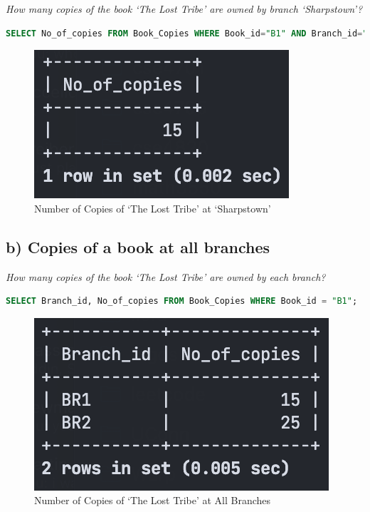 \documentclass{article}
\begin{document}
\textit{How many copies of the book `The Lost Tribe' are owned by branch `Sharpstown'?}

\begin{lstlisting}[language=SQL,
    deletekeywords={IDENTITY},
    deletekeywords={[2]INT},
    morekeywords={clustered},
    framesep=8pt,
    xleftmargin=40pt,
    framexleftmargin=40pt,
    frame=tb,
    framerule=0pt ]
SELECT No_of_copies FROM Book_Copies WHERE Book_id="B1" AND Branch_id="BR1";
\end{lstlisting}

\begin{figure}[!h]
    \centering
    \includegraphics[scale=0.6]{images/q4-a-results.png}
    \caption{Number of Copies of `The Lost Tribe' at `Sharpstown'}
    \label{fig:q4_a_copies_of_book}
\end{figure}

\subsection{b) Copies of a book at all branches}

\textit{How many copies of the book `The Lost Tribe' are owned by each branch?}

\begin{lstlisting}[language=SQL,
    deletekeywords={IDENTITY},
    deletekeywords={[2]INT},
    morekeywords={clustered},
    framesep=8pt,
    xleftmargin=40pt,
    framexleftmargin=40pt,
    frame=tb,
    framerule=0pt ]
SELECT Branch_id, No_of_copies FROM Book_Copies WHERE Book_id = "B1"; 
\end{lstlisting}

\begin{figure}[!h]
    \centering
    \includegraphics[scale=0.6]{images/q4-b-results.png}
    \caption{Number of Copies of `The Lost Tribe' at All Branches}
    \label{fig:q4_b_copies_of_book}
\end{figure}
\end{document}
